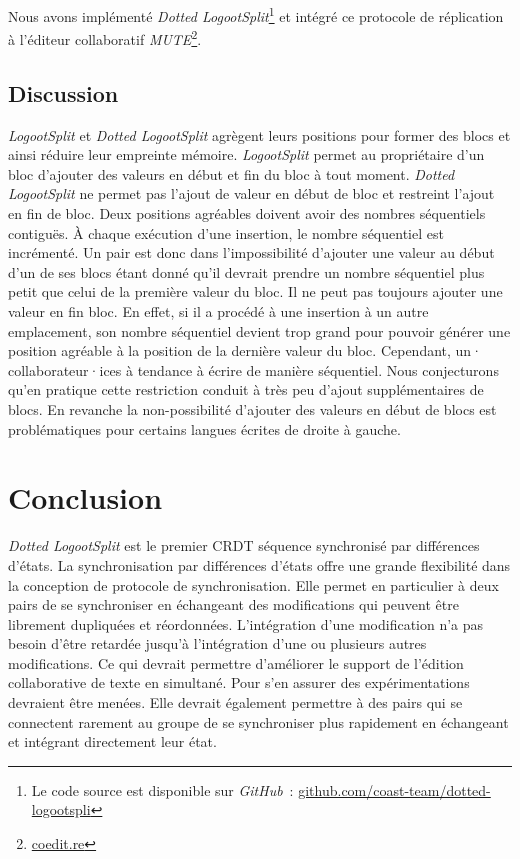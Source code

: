 Nous avons implémenté \emph{Dotted LogootSplit}\footnote{Le code source est disponible sur \emph{GitHub}~: \href{https://github.com/coast-team/dotted-logootsplit}{github.com/coast-team/dotted-logootspli}} et intégré ce protocole de réplication à l'éditeur collaboratif \emph{MUTE}\footnote{\href{https://coedit.re}{coedit.re}}.

\subsection{Discussion}

\emph{LogootSplit} et \emph{Dotted LogootSplit} agrègent leurs positions pour former des blocs et ainsi réduire leur empreinte mémoire.
\emph{LogootSplit} permet au propriétaire d'un bloc d'ajouter des valeurs en début et fin du bloc à tout moment.
\emph{Dotted LogootSplit} ne permet pas l'ajout de valeur en début de bloc et restreint l'ajout en fin de bloc.
Deux positions agréables doivent avoir des nombres séquentiels contiguës.
À chaque exécution d'une insertion, le nombre séquentiel est incrémenté.
Un pair est donc dans l'impossibilité d'ajouter une valeur au début d'un de ses blocs étant donné qu'il devrait prendre un nombre séquentiel plus petit que celui de la première valeur du bloc.
Il ne peut pas toujours ajouter une valeur en fin bloc.
En effet, si il a procédé à une insertion à un autre emplacement, son nombre séquentiel devient trop grand pour pouvoir générer une position agréable à la position de la dernière valeur du bloc.
Cependant, un· collaborateur·ices à tendance à écrire de manière séquentiel.
Nous conjecturons qu'en pratique cette restriction conduit à très peu d'ajout supplémentaires de blocs.
En revanche la non-possibilité d'ajouter des valeurs en début de blocs est problématiques pour certains langues écrites de droite à gauche.


\section{Conclusion}

\emph{Dotted LogootSplit} est le premier \ac{CRDT} séquence synchronisé par différences d'états.
La synchronisation par différences d'états offre une grande flexibilité dans la conception de protocole de synchronisation.
Elle permet en particulier à deux pairs de se synchroniser en échangeant des modifications qui peuvent être librement dupliquées et réordonnées.
L'intégration d'une modification n'a pas besoin d'être retardée jusqu'à l'intégration d'une ou plusieurs autres modifications.
Ce qui devrait permettre d'améliorer le support de l'édition collaborative de texte en simultané.
Pour s'en assurer des expérimentations devraient être menées.
Elle devrait également permettre à des pairs qui se connectent rarement au groupe de se synchroniser plus rapidement en échangeant et intégrant directement leur état.
